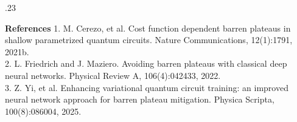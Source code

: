 \documentclass[final]{beamer}
\begin{document}
\begin{frame}[t]
\begin{columns}[t]
\begin{column}{.23\textwidth}
    \begin{block}{\textbf{References}}
        \small
        1. M. Cerezo, et al. Cost function dependent barren plateaus in shallow parametrized quantum circuits. Nature Communications, 12(1):1791, 2021b. \\
        2. L. Friedrich and J. Maziero. Avoiding barren plateaus with classical deep neural networks. Physical Review A, 106(4):042433, 2022. \\
        3. Z. Yi, et al. Enhancing variational quantum circuit training: an improved neural network approach for barren plateau mitigation. Physica Scripta, 100(8):086004, 2025.
    \end{block}

\end{column}
    
    \hspace{0.5cm}
\end{columns}

\end{frame}
\end{document}
